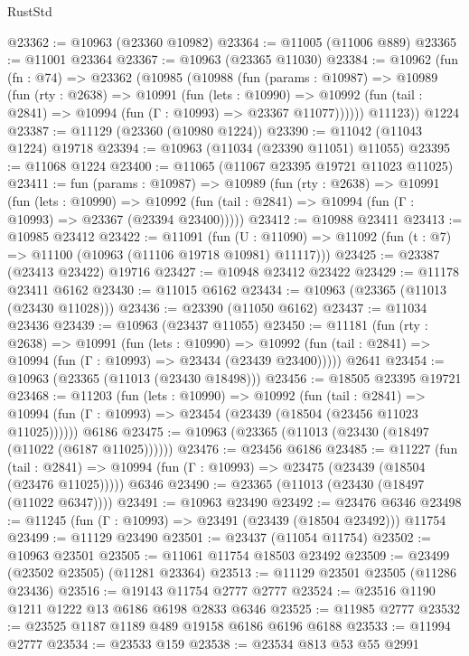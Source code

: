 \begin{lexlean}{RustStd}
\begin{coremodule}
@23362 := @10963 (@23360 @10982)
@23364 := @11005 (@11006 @889)
@23365 := @11001 @23364
@23367 := @10963 (@23365 @11030)
@23384 := @10962
    (fun (fn : @74) =>
    @23362
      (@10985
        (@10988
          (fun (params : @10987) =>
          @10989
            (fun (rty : @2638) =>
            @10991
              (fun (lets : @10990) =>
              @10992 (fun (tail : @2841) => @10994 (fun (Γ : @10993) => @23367 @11077))))))
        @11123))
    @1224
@23387 := @11129 (@23360 (@10980 @1224))
@23390 := @11042 (@11043 @1224) @19718
@23394 := @10963 (@11034 (@23390 @11051) @11055)
@23395 := @11068 @1224
@23400 := @11065 (@11067 @23395 @19721 @11023 @11025)
@23411 := fun (params : @10987) =>
  @10989
    (fun (rty : @2638) =>
    @10991
      (fun (lets : @10990) =>
      @10992 (fun (tail : @2841) => @10994 (fun (Γ : @10993) => @23367 (@23394 @23400)))))
@23412 := @10988 @23411
@23413 := @10985 @23412
@23422 := @11091
    (fun (U : @11090) => @11092 (fun (t : @7) => @11100 (@10963 (@11106 @19718 @10981) @11117)))
@23425 := @23387 (@23413 @23422) @19716
@23427 := @10948 @23412 @23422
@23429 := @11178 @23411 @6162
@23430 := @11015 @6162
@23434 := @10963 (@23365 (@11013 (@23430 @11028)))
@23436 := @23390 (@11050 @6162)
@23437 := @11034 @23436
@23439 := @10963 (@23437 @11055)
@23450 := @11181
    (fun (rty : @2638) =>
    @10991
      (fun (lets : @10990) =>
      @10992 (fun (tail : @2841) => @10994 (fun (Γ : @10993) => @23434 (@23439 @23400)))))
    @2641
@23454 := @10963 (@23365 (@11013 (@23430 @18498)))
@23456 := @18505 @23395 @19721
@23468 := @11203
    (fun (lets : @10990) =>
    @10992
      (fun (tail : @2841) =>
      @10994 (fun (Γ : @10993) => @23454 (@23439 (@18504 (@23456 @11023 @11025))))))
    @6186
@23475 := @10963 (@23365 (@11013 (@23430 (@18497 (@11022 (@6187 @11025))))))
@23476 := @23456 @6186
@23485 := @11227
    (fun (tail : @2841) => @10994 (fun (Γ : @10993) => @23475 (@23439 (@18504 (@23476 @11025)))))
    @6346
@23490 := @23365 (@11013 (@23430 (@18497 (@11022 @6347))))
@23491 := @10963 @23490
@23492 := @23476 @6346
@23498 := @11245 (fun (Γ : @10993) => @23491 (@23439 (@18504 @23492))) @11754
@23499 := @11129 @23490
@23501 := @23437 (@11054 @11754)
@23502 := @10963 @23501
@23505 := @11061 @11754 @18503 @23492
@23509 := @23499 (@23502 @23505) (@11281 @23364)
@23513 := @11129 @23501 @23505 (@11286 @23436)
@23516 := @19143 @11754 @2777 @2777
@23524 := @23516 @1190 @1211 @1222 @13 @6186 @6198 @2833 @6346
@23525 := @11985 @2777
@23532 := @23525 @1187 @1189 @489 @19158 @6186 @6196 @6188
@23533 := @11994 @2777
@23534 := @23533 @159
@23538 := @23534 @813 @53 @55 @2991

\end{coremodule}
\end{lexlean}
